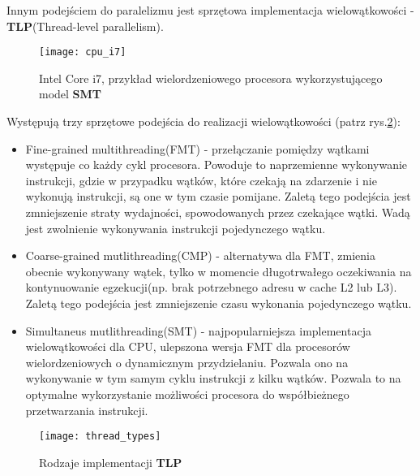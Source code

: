 \documentclass[document.tex]{subfiles}
\begin{document}
\indent Innym podejściem do paralelizmu jest sprzętowa implementacja wielowątkowości - \textbf{TLP}(Thread-level parallelism).
\begin{figure}[h]
\texttt{[image: cpu\_i7]}
\caption{Intel Core i7, przykład wielordzeniowego procesora wykorzystującego model \textbf{SMT} \protect\cite{OS_Stallings}}
\label{fig:cpu_i7}
\end{figure}
Występują trzy sprzętowe podejścia do realizacji wielowątkowości\cite{Computer_Architecture_Patterson_Hennesy}
(patrz rys.\ref{fig:thread_types}):
\begin{itemize}
\item Fine-grained multithreading(FMT) - przełączanie pomiędzy wątkami występuje 
co każdy cykl procesora. Powoduje to naprzemienne wykonywanie instrukcji, gdzie w przypadku wątków, które czekają na zdarzenie i nie wykonują instrukcji, są one w tym czasie pomijane. Zaletą tego podejścia jest zmniejszenie straty wydajności, spowodowanych przez czekające wątki. Wadą jest zwolnienie wykonywania instrukcji pojedynczego wątku.
\item Coarse-grained mutlithreading(CMP) - alternatywa dla FMT, zmienia obecnie wykonywany wątek, tylko w momencie długotrwałego oczekiwania na kontynuowanie egzekucji(np. brak potrzebnego adresu w cache L2 lub L3). Zaletą tego podejścia jest
zmniejszenie czasu wykonania pojedynczego wątku. 
\item Simultaneus mutlithreading(SMT) - najpopularniejsza implementacja wielowątkowości dla CPU, ulepszona wersja FMT dla
procesorów wielordzeniowych o dynamicznym przydzielaniu.
Pozwala ono na wykonywanie w tym samym cyklu instrukcji z kilku
wątków. Pozwala to na optymalne wykorzystanie możliwości procesora do współbieżnego przetwarzania instrukcji.
\end{itemize}

\begin{figure}[h]
\texttt{[image: thread\_types]}
\caption{Rodzaje implementacji \textbf{TLP}}
\label{fig:thread_types}
\end{figure}
\end{document}
